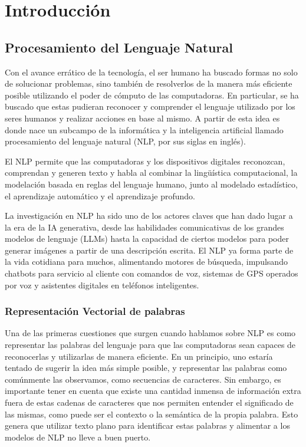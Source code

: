 \chapter{Introducción}

\section{Procesamiento del Lenguaje Natural}

Con el avance errático de la tecnología, el ser humano ha buscado formas no solo de solucionar 
problemas, sino también de resolverlos de la manera más eficiente posible utilizando 
el poder de cómputo de las computadoras. En particular, se ha buscado que estas 
pudieran reconocer y comprender el lenguaje utilizado por los seres humanos y 
realizar acciones en base al mismo. A partir de esta idea es donde nace un subcampo 
de la informática y la inteligencia artificial llamado procesamiento del lenguaje natural (NLP, por sus siglas en inglés).

El NLP permite que las computadoras y los dispositivos digitales reconozcan, comprendan y generen texto y habla al combinar la lingüística computacional, la modelación basada en reglas del lenguaje humano, junto al modelado estadístico, el aprendizaje automático y el aprendizaje profundo.

La investigación en NLP ha sido uno de los actores claves que han dado lugar a la era de la IA generativa, desde las habilidades comunicativas de los grandes modelos de lenguaje (LLMs) hasta la capacidad de ciertos modelos para poder generar imágenes a partir de una descripción escrita. El NLP ya forma parte de la vida cotidiana para muchos, alimentando motores de búsqueda, impulsando chatbots para servicio al cliente con comandos de voz, sistemas de GPS operados por voz y asistentes digitales en teléfonos inteligentes.

\subsection{Representación Vectorial de palabras}

Una de las primeras cuestiones que surgen cuando hablamos sobre NLP es como representar las palabras del lenguaje para que las computadoras sean capaces de reconocerlas y utilizarlas de manera eficiente. En un principio, uno estaría tentado de sugerir la idea más simple posible, y representar las palabras como comúnmente las observamos, como secuencias de caracteres. Sin embargo, es importante tener en cuenta que existe una cantidad inmensa de información extra fuera de estas cadenas de caracteres que nos permiten entender el significado de las mismas, como puede ser el contexto o la semántica de la propia palabra. Esto genera que utilizar texto plano para identificar estas palabras y alimentar a los modelos de NLP no lleve a buen puerto.

